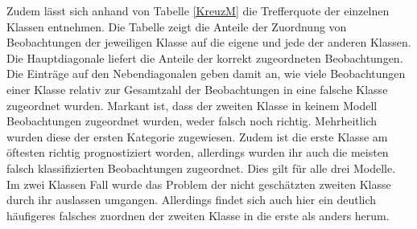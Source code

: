 \documentclass{Vorlage}
\begin{document}
Zudem lässt sich anhand von Tabelle \ref{KreuzM} die Trefferquote der einzelnen Klassen entnehmen. Die Tabelle zeigt die Anteile der Zuordnung von Beobachtungen der jeweiligen Klasse auf die eigene und jede der anderen Klassen. Die Hauptdiagonale liefert die Anteile der korrekt zugeordneten Beobachtungen. Die Einträge auf den Nebendiagonalen geben damit an, wie viele Beobachtungen einer Klasse relativ zur Gesamtzahl der Beobachtungen in eine falsche Klasse zugeordnet wurden. Markant ist, dass der zweiten Klasse in keinem Modell Beobachtungen zugeordnet wurden, weder falsch noch richtig. Mehrheitlich wurden diese der ersten Kategorie zugewiesen. Zudem ist die erste Klasse am öftesten richtig prognostiziert worden, allerdings wurden ihr auch die meisten falsch klassifizierten Beobachtungen zugeordnet. Dies gilt für alle drei Modelle. Im zwei Klassen Fall wurde das Problem der nicht geschätzten zweiten Klasse durch ihr auslassen umgangen. Allerdings findet sich auch hier ein deutlich häufigeres falsches zuordnen der zweiten Klasse in die erste als anders herum. 
\end{document}
